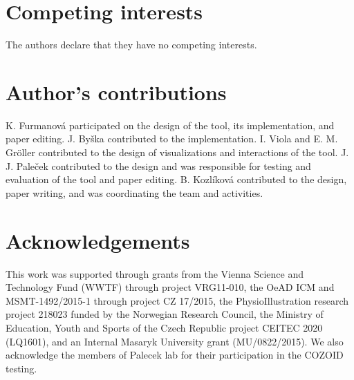 \documentclass{bmcart}
\begin{document}

\begin{backmatter}

\section*{Competing interests}
  The authors declare that they have no competing interests.

\section*{Author's contributions}
K. Furmanov\'{a} participated on the design of the tool, its implementation, and paper editing.  J. By\v{s}ka contributed to the implementation. I. Viola and E. M. Gr\"{o}ller contributed to the design of visualizations and interactions of the tool. J. J. Pale\v{c}ek contributed to the design and was responsible for testing and evaluation of the tool and paper editing. B. Kozl\'{i}kov\'{a} contributed to the design, paper writing, and was coordinating the team and activities.

\section*{Acknowledgements}
This work was supported through grants from the Vienna Science and Technology Fund (WWTF) through project VRG11-010, the OeAD ICM and MSMT-1492/2015-1 through project CZ 17/2015, the PhysioIllustration research project 218023 funded by the Norwegian Research Council, the Ministry of Education, Youth and Sports of the Czech Republic project CEITEC 2020 (LQ1601), and an Internal Masaryk University grant (MU/0822/2015). We also acknowledge the members of Palecek lab for their participation in the COZOID testing. 



\end{backmatter}
\end{document}
